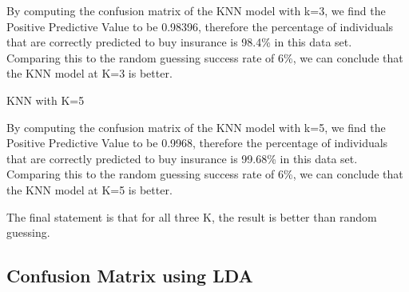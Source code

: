 \documentclass{article}
\begin{document}
By computing the confusion matrix of the KNN model with k=3, we find the Positive Predictive Value to be 0.98396, therefore the percentage of individuals that are correctly predicted to buy insurance is 98.4\% in this data set. Comparing this to the random guessing success rate of 6\%, we can conclude that the KNN model at K=3 is better.\\

\newpage

\begin{table}[!htb]
\caption{KNN with K=5}
\label{model1}
\begin{center}


\end{center}
\end{table}





By computing the confusion matrix of the KNN model with k=5, we find the Positive Predictive Value to be 0.9968, therefore the percentage of individuals that are correctly predicted to buy insurance is 99.68\% in this data set. Comparing this to the random guessing success rate of 6\%, we can conclude that the KNN model at K=5 is better.\\
\newline

The final statement is that for all three K, the result is better than random guessing.
\newpage

\subsection{Confusion Matrix using LDA}
\end{document}
